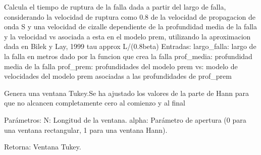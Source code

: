 \documentclass[letterpaper,10pt,english]{sphinxmanual}
\begin{document}

\begin{fulllineitems}
\label{\detokenize{main:main.tau_ruptura_prem}}
\pysigstartsignatures
{}
\pysigstopsignatures
\sphinxAtStartPar
Calcula el tiempo de ruptura de la falla dada a partir del largo de falla, considerando
la velocidad de ruptura como 0.8 de la velocidad de propagacion de onda S y 
una velocidad de cizalle dependiente de la profundidad media de la falla
y la velocidad vs asociada a esta en el modelo prem, utilizando la aproximacion dada en Bilek y Lay, 1999
tau approx L/(0.8beta) 
Entradas: 
largo\_falla: largo de la falla en metros dado por la funcion que crea la falla
prof\_media: profundidad media de la falla
prof\_prem: profundidades del modelo prem
vs: modelo de velocidades del modelo prem asociadas a las profundidades de prof\_prem

\end{fulllineitems}


\begin{fulllineitems}
\label{\detokenize{main:main.tukey_window}}
\pysigstartsignatures
{}
\pysigstopsignatures
\sphinxAtStartPar
Genera una ventana Tukey.Se ha
ajustado los valores de la parte de Hann para que no alcancen completamente cero al comienzo y al final

\sphinxAtStartPar
Parámetros:
\sphinxhyphen{} N: Longitud de la ventana.
\sphinxhyphen{} alpha: Parámetro de apertura (0 para una ventana rectangular, 1 para una ventana Hann).

\sphinxAtStartPar
Retorna:
\sphinxhyphen{} Ventana Tukey.

\end{fulllineitems}

\end{document}
